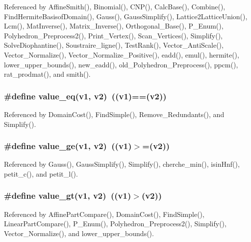 Referenced by Affine\-Smith(), Binomial(), CNP(), Calc\-Base(), Combine(), Find\-Hermite\-Basisof\-Domain(), Gauss(), Gauss\-Simplify(), Lattice2Lattice\-Union(), Lcm(), Mat\-Inverse(), Matrix\_\-Inverse(), Orthogonal\_\-Base(), P\_\-Enum(), Polyhedron\_\-Preprocess2(), Print\_\-Vertex(), Scan\_\-Vertices(), Simplify(), Solve\-Diophantine(), Soustraire\_\-ligne(), Test\-Rank(), Vector\_\-Anti\-Scale(), Vector\_\-Normalize(), Vector\_\-Normalize\_\-Positive(), eadd(), emul(), hermite(), lower\_\-upper\_\-bounds(), new\_\-eadd(), old\_\-Polyhedron\_\-Preprocess(), ppcm(), rat\_\-prodmat(), and smith().

\subsubsection{\setlength{\rightskip}{0pt plus 5cm}\#define value\_\-eq(v1, v2)\ ((v1)==(v2))}\label{arithmetique_8h_a22}




Referenced by Domain\-Cost(), Find\-Simple(), Remove\_\-Redundants(), and Simplify().

\subsubsection{\setlength{\rightskip}{0pt plus 5cm}\#define value\_\-ge(v1, v2)\ ((v1)$>$=(v2))}\label{arithmetique_8h_a25}




Referenced by Gauss(), Gauss\-Simplify(), Simplify(), cherche\_\-min(), isin\-Hnf(), petit\_\-c(), and petit\_\-l().

\subsubsection{\setlength{\rightskip}{0pt plus 5cm}\#define value\_\-gt(v1, v2)\ ((v1)$>$(v2))}\label{arithmetique_8h_a24}




Referenced by Affine\-Part\-Compare(), Domain\-Cost(), Find\-Simple(), Linear\-Part\-Compare(), P\_\-Enum(), Polyhedron\_\-Preprocess2(), Simplify(), Vector\_\-Normalize(), and lower\_\-upper\_\-bounds().

